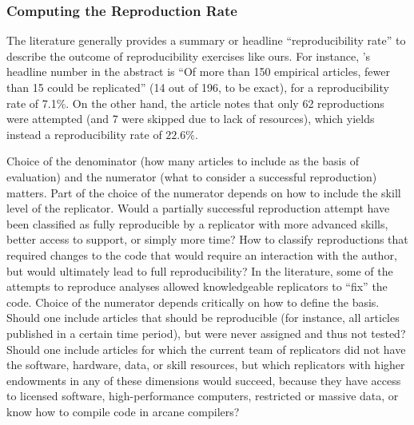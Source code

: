 \documentclass{cje} %
\theoremstyle{plain}%
\theoremstyle{definition}
\theoremstyle{remark}
\begin{document}
%

\subsubsection{Computing the Reproduction Rate}


The literature generally provides a summary or headline ``reproducibility rate'' to describe the outcome of reproducibility exercises like ours.  For instance, \cite{McCullough2006}'s headline number in the abstract is ``Of more than 150 empirical articles, fewer than 15 could be replicated'' (14 out of 196, to be exact), for a reproducibility rate of 7.1\%. 
On the other hand, the article notes that only 62 reproductions were attempted (and 7 were skipped due to lack of resources), which yields instead a reproducibility rate of $22.6\%$. 

Choice of the denominator (how many articles to include as the basis of evaluation) and the numerator (what to consider a successful reproduction) matters.  Part of the choice of the numerator depends on how to include the skill level of the replicator. Would a partially successful reproduction attempt have been classified as fully reproducible by a replicator with more advanced skills, better access to support, or simply more time? How to classify reproductions that required changes to the code that would require an interaction with the author, but would ultimately lead to full reproducibility? In the literature, some of the attempts to reproduce analyses allowed  knowledgeable replicators to ``fix'' the code. Choice of the numerator depends critically on how to define the basis. Should one include articles that should be reproducible (for instance, all articles published in a certain time period), but were never assigned and thus not tested? Should one include articles for which the current team of replicators did not have the software, hardware, data, or skill resources, but which replicators with higher endowments in any of these dimensions would succeed, because they have access to licensed software, high-performance computers, restricted or massive data, or know how to compile code in arcane compilers?
\end{document}
